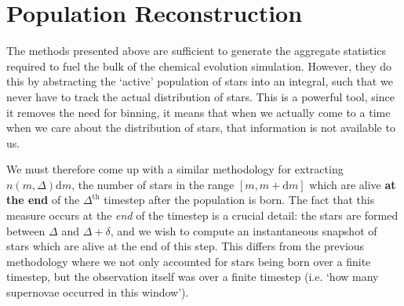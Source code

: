 \documentclass[a4paper,11pt]{article}
\def\d{\mathrm d}
\begin{document}
	\newpage
	\section{Population Reconstruction}

		The methods presented above are sufficient to generate the aggregate statistics required to fuel the bulk of the chemical evolution simulation. However, they do this by abstracting the `active' population of stars into an integral, such that we never have to track the actual distribution of stars. This is a powerful tool, since it removes the need for binning, it means that when we actually come to a time when we care about the distribution of stars, that information is not available to us.

		We must therefore come up with a similar methodology for extracting $n(m,\Delta)\d m$, the number of stars in the range $[m,m+\d m]$ which are alive \textbf{at the end} of the $\Delta^\text{th}$ timestep after the population is born. The fact that this measure occurs at the \textit{end} of the timestep is a crucial detail: the stars are formed between $\Delta$ and $\Delta + \delta$, and we wish to compute an instantaneous snapshot of stars which are alive at the end of this step. This differs from the previous methodology where we not only accounted for stars being born over a finite timestep, but the observation itself was over a finite timestep (i.e. `how many supernovae occurred in this window').
\end{document}
